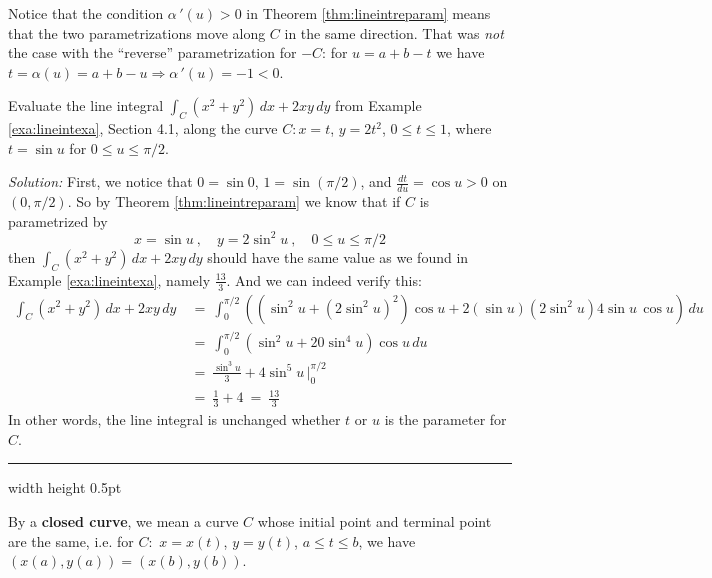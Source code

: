 Notice that the condition $\alpha\,'(u) > 0$ in Theorem \ref{thm:lineintreparam} means that the two parametrizations
move along $C$ in the same direction. That was \emph{not} the case with the ``reverse'' parametrization for $-C$: for
$u=a+b-t$ we have $t=\alpha(u)=a+b-u \Rightarrow \alpha\,'(u) = -1 <0$.
   \begin{exa}
 Evaluate the line integral $\int_C (x^2 + y^2 )\,dx + 2xy\,dy$ from Example \ref{exa:lineintexa}, Section 4.1, along
 the curve $C: x=t$, $y=2t^2$, $0 \le t \le 1$, where $t=\sin u$ for $0 \le u \le \pi/2$.\vspace{1mm}
 \par\noindent \emph{Solution:} First, we notice that $0=\sin 0$, $1=\sin (\pi/2)$, and $\frac{dt}{du} = \cos u > 0$ on
 $(0,\pi/2)$. So by Theorem \ref{thm:lineintreparam} we know that if $C$ is parametrized by
 \begin{displaymath}
  x=\sin u ~,\quad y = 2\sin^2 u ~,\quad 0 \le u \le \pi/2
 \end{displaymath}
 then $\int_C (x^2 + y^2 )\,dx + 2xy\,dy$ should have the same value as we found in Example \ref{exa:lineintexa},
 namely $\frac{13}{3}$. And we can indeed verify this:
 \begin{align*}
  \int_C (x^2 + y^2 )\,dx + 2xy\,dy ~&=~ \int_0^{\pi/2} \left( (\sin^2 u + (2\sin^2 u)^2) \cos u +
   2(\sin u)(2\sin^2 u) 4\sin u \, \cos u \right)\,du\\
   &=~ \int_0^{\pi/2} \left( \sin^2 u + 20\sin^4 u \right) \cos u\,du\\
   &=~ \frac{\sin^3 u}{3} + 4\sin^5 u \,\Bigg|_0^{\pi/2}\\
   &=~ \frac{1}{3} + 4 ~=~ \frac{13}{3}
 \end{align*}
 In other words, the line integral is unchanged whether $t$ or $u$ is the parameter for $C$.
\end{exa}
\hrule width \textwidth height 0.5pt
\vspace{3mm}

By a \textbf{closed curve}, we mean a curve $C$ whose initial point and terminal point are the same, i.e. for $C:$
$x=x(t)$, $y=y(t)$, $a \le t \le b$, we have $(x(a),y(a)) = (x(b),y(b))$.


